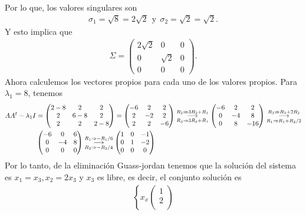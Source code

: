 \documentclass[11pt,letterpaper]{article}
\newcommand{\grstep}[2][\relax]{%
   \ensuremath{\mathrel{
       {\mathop{\longrightarrow}\limits^{#2\mathstrut}_{
                                     \begin{subarray}{l} #1 \end{subarray}}}}}}
\begin{document}
\begin{enumerate}
\begin{align*}
\end{align*}
Por lo que, los valores singulares son
\begin{align*}
\sigma_1=\sqrt{8}=2\sqrt{2} \ \ \text{y} \ \ \sigma_2=\sqrt{2}=\sqrt{2}.  
\end{align*}
Y esto implica que 
\begin{align*}
\Sigma = \begin{pmatrix}
2\sqrt{2} & 0 & 0\\
0 & \sqrt{2} & 0\\
0 & 0 & 0
\end{pmatrix}.
\end{align*}
Ahora calculemos los vectores propios para cada uno de los valores propios. Para $\lambda_1=8$, tenemos 
\begin{align*}
AA^t-\lambda_1I&=\begin{pmatrix}
2-8 & 2 & 2 \\
2& 6-8 & 2\\
2 & 2 & 2-8
\end{pmatrix}=\begin{pmatrix}
-6 & 2 & 2 \\
2& -2 & 2\\
2 & 2 & -6
\end{pmatrix}%
\grstep[R_3 \Rightarrow 3R_3+R_1]{R_2 \Rightarrow 3R_2+R_1}
%
\begin{pmatrix}
-6 & 2 & 2 \\
 0 &-4 & 8\\
 0 & 8 & -16
\end{pmatrix}
%
\grstep[R_1\Rightarrow R_1+R_2/2]{R_3 \Rightarrow R_3+2R_2}
\\
&\begin{pmatrix}
-6 & 0 & 6 \\
 0 &-4 & 8\\
 0 & 0 & 0
\end{pmatrix}%
\grstep[R_2\Rightarrow -R_2/4]{R_1 \Rightarrow -R_1/6}
%
\begin{pmatrix}
 1 & 0 &-1 \\
 0 & 1 &-2\\
 0 & 0 & 0
\end{pmatrix}
\end{align*}
Por lo tanto, de la eliminación Guass-jordan tenemos que la solución del sistema es $x_1=x_3, x_2=2x_3$ y $x_3$ es libre, es decir, el conjunto solución es
\begin{align*}
\left\{x_x\begin{pmatrix}
 1\\
 2\\

\end{pmatrix}
\end{align*}
\end{enumerate}
\end{document}
